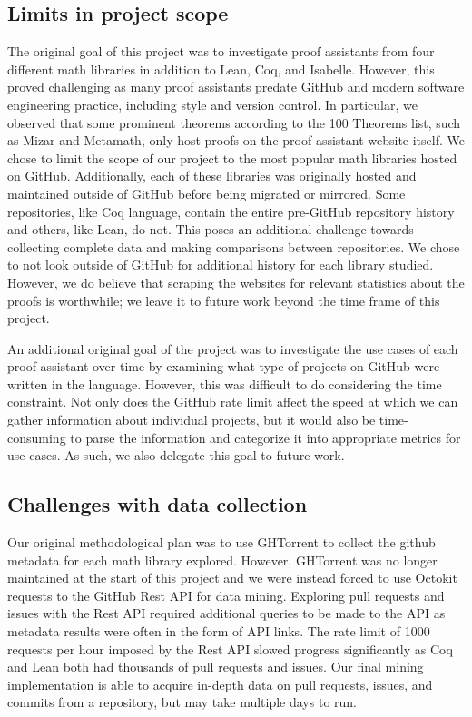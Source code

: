 \documentclass[sigconf,nonacm]{acmart}
\begin{document}
\subsection{Limits in project scope}

The original goal of this project was to investigate proof assistants from four different math libraries in addition to Lean, Coq, and Isabelle. However, this proved challenging as many proof assistants predate GitHub and modern software engineering practice, including style and version control. In particular, we observed that some prominent theorems according to the 100 Theorems list, such as Mizar and Metamath, only host proofs on the proof assistant website itself. We chose to limit the scope of our project to the most popular math libraries hosted on GitHub. Additionally, each of these libraries was originally hosted and maintained outside of GitHub before being migrated or mirrored. Some repositories, like Coq language, contain the entire pre-GitHub repository history and others, like Lean, do not. This poses an additional challenge towards collecting complete data and making comparisons between repositories. We chose to not look outside of GitHub for additional history for each library studied. However, we do believe that scraping the websites for relevant statistics about the proofs is worthwhile; we leave it to future work beyond the time frame of this project.

An additional original goal of the project was to investigate the use cases of each proof assistant over time by examining what type of projects on GitHub were written in the language. However, this was difficult to do considering the time constraint. Not only does the GitHub rate limit affect the speed at which we can gather information about individual projects, but it would also be time-consuming to parse the information and categorize it into appropriate metrics for use cases. As such, we also delegate this goal to future work.

\subsection{Challenges with data collection}

Our original methodological plan was to use GHTorrent to collect the github metadata for each math library explored. However, GHTorrent was no longer maintained at the start of this project and we were instead forced to use Octokit requests to the GitHub Rest API for data mining. Exploring pull requests and issues with the Rest API required additional queries to be made to the API as metadata results were often in the form of API links. The rate limit of 1000 requests per hour imposed by the Rest API slowed progress significantly as Coq and Lean both had thousands of pull requests and issues. Our final mining implementation is able to acquire in-depth data on pull requests, issues, and commits from a repository, but may take multiple days to run.
\end{document}
